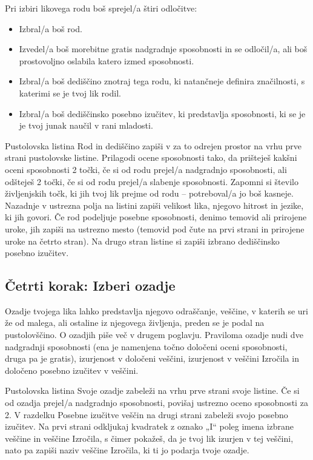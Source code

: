Pri izbiri likovega rodu boš sprejel/a štiri odločitve:

\begin{itemize}
    \item Izbral/a boš rod.
    \item Izvedel/a boš morebitne gratis nadgradnje sposobnosti in se odločil/a, ali boš prostovoljno oslabila katero izmed sposobnosti.
    \item Izbral/a boš dediščino znotraj tega rodu, ki natančneje definira značilnosti, s katerimi se je tvoj lik rodil.
    \item Izbral/a boš dediščinsko posebno izučitev, ki predstavlja sposobnosti, ki se je je tvoj junak naučil v rani mladosti.
\end{itemize}

\begin{rpg-titlebox}{Pustolovska listina}
    Rod in dediščino zapiši v za to odrejen prostor na vrhu prve strani pustolovske listine. Prilagodi ocene sposobnosti tako, da prišteješ kakšni oceni sposobnosti 2 točki, če si od rodu prejel/a nadgradnjo sposobnosti, ali odšteješ 2 točki, če si od rodu prejel/a slabenje sposobnosti. Zapomni si število življenjskih točk, ki jih tvoj lik prejme od rodu -- potreboval/a jo boš kasneje. Nazadnje v ustrezna polja na listini zapiši velikost lika, njegovo hitrost in jezike, ki jih govori. Če rod podeljuje posebne sposobnosti, denimo temovid ali prirojene uroke, jih zapiši na ustrezno mesto (temovid pod čute na prvi strani in prirojene uroke na četrto stran). Na drugo stran listine si zapiši izbrano dediščinsko posebno izučitev.
\end{rpg-titlebox}

\subsection{Četrti korak: Izberi ozadje}
Ozadje tvojega lika lahko predstavlja njegovo odraščanje, veščine, v katerih se uri že od malega, ali ostaline iz njegovega življenja, preden se je podal na pustolovščino. O ozadjih piše več v drugem poglavju. Praviloma ozadje nudi dve nadgradnji sposobnosti (ena je namenjena točno določeni oceni sposobnosti, druga pa je gratis), izurjenost v določeni veščini, izurjenost v veščini Izročila in določeno posebno izučitev v veščini.

\begin{rpg-titlebox}{Pustolovska listina}
    Svoje ozadje zabeleži na vrhu prve strani svoje listine. Če si od ozadja prejel/a nadgradnjo sposobnosti, povišaj ustrezno oceno sposobnosti za 2. V razdelku Posebne izučitve veščin na drugi strani zabeleži svojo posebno izučitev. Na prvi strani odkljukaj kvadratek z oznako „I“ poleg imena izbrane veščine in veščine Izročila, s čimer pokažeš, da je tvoj lik izurjen v tej veščini, nato pa zapiši naziv veščine Izročila, ki ti jo podarja tvoje ozadje.
\end{rpg-titlebox}

